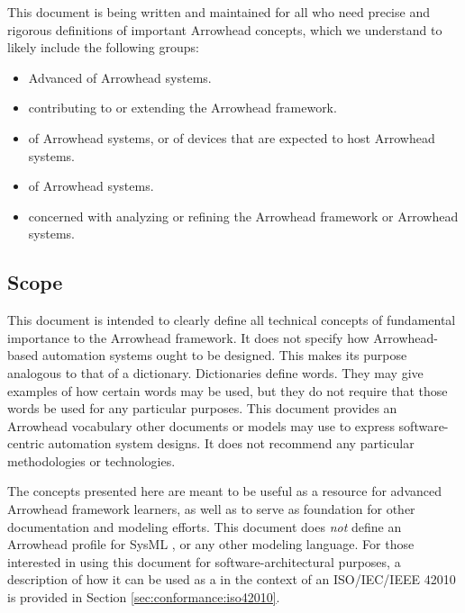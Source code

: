 This document is being written and maintained for all who need precise and rigorous definitions of important Arrowhead concepts, which we understand to likely include the following groups:

\begin{itemize}
\item Advanced  of Arrowhead systems.
\item {} contributing to or extending the Arrowhead framework.
\item {} of Arrowhead systems, or of devices that are expected to host Arrowhead systems.
\item {} of Arrowhead systems.
\item {} concerned with analyzing or refining the Arrowhead framework or Arrowhead systems.
\end{itemize}

\subsection{Scope}
\label{sec:introduction:scope}

This document is intended to clearly define all technical concepts of fundamental importance to the Arrowhead framework.
It does not specify how Arrowhead-based automation systems ought to be designed.
This makes its purpose analogous to that of a dictionary.
Dictionaries define words.
They may give examples of how certain words may be used, but they do not require that those words be used for any particular purposes.
This document provides an Arrowhead vocabulary other documents or models may use to express software-centric automation system designs.
It does not recommend any particular methodologies or technologies.

The concepts presented here are meant to be useful as a resource for advanced Arrowhead framework learners, as well as to serve as foundation for other documentation and modeling efforts.
This document does \textit{not} define an Arrowhead profile for SysML \cite{omg2019sysml}, or any other modeling language.
For those interested in using this document for software-architectural purposes, a description of how it can be used as a  in the context of an ISO/IEC/IEEE 42010  is provided in Section \ref{sec:conformance:iso42010}.

